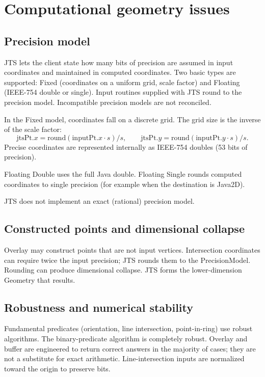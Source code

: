 \documentclass[11pt]{article}
\begin{document}
\section{Computational geometry issues}

\subsection{Precision model}
JTS lets the client state how many bits of precision are assumed in
input coordinates and maintained in computed coordinates. Two basic
types are supported: Fixed (coordinates on a uniform grid, scale
factor) and Floating (IEEE-754 double or single). Input routines
supplied with JTS round to the precision model. Incompatible
precision models are not reconciled.

In the Fixed model, coordinates fall on a discrete grid. The grid
size is the inverse of the scale factor:
\[
  \mathrm{jtsPt}.x = \mathrm{round}(\mathrm{inputPt}.x \cdot s) / s,
  \qquad
  \mathrm{jtsPt}.y = \mathrm{round}(\mathrm{inputPt}.y \cdot s) / s.
\]
Precise coordinates are represented internally as IEEE-754 doubles
(53 bits of precision).

Floating Double uses the full Java double. Floating Single rounds
computed coordinates to single precision (for example when the
destination is Java2D).

JTS does not implement an exact (rational) precision model.

\subsection{Constructed points and dimensional collapse}
Overlay may construct points that are not input vertices.
Intersection coordinates can require twice the input precision; JTS
rounds them to the PrecisionModel. Rounding can produce dimensional
collapse. JTS forms the lower-dimension Geometry that results.

\subsection{Robustness and numerical stability}
Fundamental predicates (orientation, line intersection, point-in-ring)
use robust algorithms. The binary-predicate algorithm is completely
robust. Overlay and buffer are engineered to return correct answers
in the majority of cases; they are not a substitute for exact
arithmetic. Line-intersection inputs are normalized toward the origin
to preserve bits.
\end{document}
